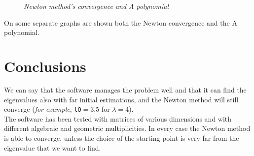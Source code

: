 \documentclass[12pt]{article}
\begin{document}
    \begin{figure}[htbp]
            \caption{\textit{Newton method's convergence and A polynomial}}
    \end{figure}
On some separate graphs are shown both the Newton convergence and the A polynomial.

    \section{Conclusions}
    We can say that the software manages the problem well and that it can find the eigenvalues also with far initial estimations, and the Newton method will still converge (\textit{for example}, \texttt{lO}$= 3.5$ for $\lambda = 4$). \\ 
    The software has been tested with matrices of various dimensions and with different algebraic and geometric multiplicities. In every case the Newton method is able to converge, unless the choice of the starting point is very far from the eigenvalue that we want to find.\\
\end{document}
